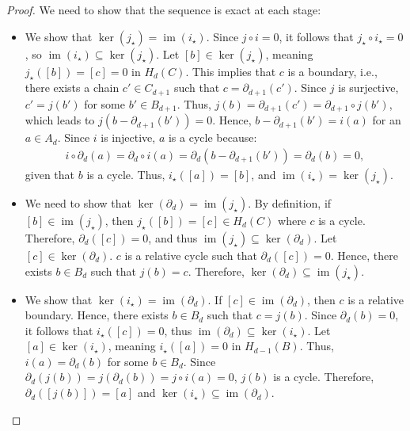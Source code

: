 \begin{proof}
	We need to show that the sequence is exact at each stage:
	\begin{itemize}
		\item We show that \(\ker(j_\star) = \operatorname{im}(i_\star)\). Since \(j \circ i = 0\), it follows that \(j_\star \circ i_\star = 0\), so \(\operatorname{im}(i_\star) \subseteq \ker(j_\star)\). Let \([b] \in \ker(j_\star)\), meaning \(j_\star([b]) = [c] = 0\) in \(H_{d}(C)\). This implies that \(c\) is a boundary, i.e., there exists a chain \(c' \in C_{d+1}\) such that \(c = \partial_{d+1}(c')\). Since \(j\) is surjective, \(c' = j(b')\) for some \(b' \in B_{d+1}\). Thus, \(j(b) = \partial_{d+1}(c') = \partial_{d+1}\circ j(b')\), which leads to $j(b - \partial_{d+1}(b')) = 0$. Hence, \(b - \partial_{d+1}(b') = i(a)\) for an \(a \in A_{d}\). Since \(i\) is injective, \(a\) is a cycle because:
		      \begin{align}
		      	i \circ \partial_{d}(a) = \partial_{d} \circ i(a) = \partial_{d}(b - \partial_{d+1}(b')) = \partial_{d}(b) = 0, 
		      \end{align}
		given that \(b\) is a cycle. Thus, \(i_\star([a]) = [b]\), and \(\operatorname{im}(i_\star) = \ker(j_\star)\).
		\item We need to show that \(\ker(\partial_d) = \operatorname{im}(j_\star)\). By definition, if \([b] \in \operatorname{im}(j_\star)\), then \(j_\star([b]) = [c] \in H_{d}(C)\) where \(c\) is a cycle. Therefore, \(\partial_d([c]) = 0\), and thus \(\operatorname{im}(j_\star) \subseteq \ker(\partial_d)\). Let \([c] \in \ker(\partial_d)\). \(c\) is a relative cycle such that \(\partial_d([c]) = 0\). Hence, there exists \(b \in B_{d}\) such that \(j(b) = c\). Therefore, \(\ker(\partial_d) \subseteq \operatorname{im}(j_\star)\).
		\item We show that \(\ker(i_\star) = \operatorname{im}(\partial_d)\). If \([c] \in \operatorname{im}(\partial_d)\), then \(c\) is a relative boundary. Hence, there exists \(b \in B_{d}\) such that \(c = j(b)\). Since \(\partial_d(b) = 0\), it follows that \(i_\star([c]) = 0\), thus \(\operatorname{im}(\partial_d) \subseteq \ker(i_\star)\). Let \([a] \in \ker(i_\star)\), meaning \(i_\star([a]) = 0\) in \(H_{d-1}(B)\). Thus, \(i(a) = \partial_d(b)\) for some \(b \in B_d\). Since \(\partial_d(j(b)) = j(\partial_d(b)) = j \circ i(a) = 0\), \(j(b)\) is a cycle. Therefore, \(\partial_d([j(b)]) = [a]\) and \(\ker(i_\star) \subseteq \operatorname{im}(\partial_d)\).
	\end{itemize}
\end{proof}

